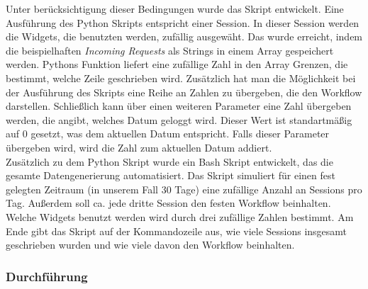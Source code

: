Unter berücksichtigung dieser Bedingungen wurde das Skript entwickelt. Eine Ausführung des Python Skripts entspricht einer Session. In dieser Session werden die Widgets, die \glqq benutzten\grqq{} werden, zufällig ausgewäht. Das wurde erreicht, indem die beispielhaften \textit{Incoming Requests} als Strings in einem Array gespeichert werden. Pythons  Funktion liefert eine zufällige Zahl in den Array Grenzen, die bestimmt, welche Zeile geschrieben wird. Zusätzlich hat man die Möglichkeit bei der Ausführung des Skripts eine Reihe an Zahlen zu übergeben, die den Workflow darstellen. Schließlich kann über einen weiteren Parameter eine Zahl übergeben werden, die angibt, welches Datum geloggt wird. Dieser Wert ist standartmäßig auf 0 gesetzt, was dem aktuellen Datum entspricht. Falls dieser Parameter übergeben wird, wird die Zahl zum aktuellen Datum addiert.\\
Zusätzlich zu dem Python Skript wurde ein Bash Skript entwickelt, das die gesamte Datengenerierung automatisiert. Das Skript simuliert für einen fest gelegten Zeitraum (in unserem Fall 30 Tage) eine zufällige Anzahl an Sessions pro Tag. Außerdem soll ca. jede dritte Session den festen Workflow beinhalten. Welche Widgets benutzt werden wird durch drei zufällige Zahlen bestimmt. Am Ende gibt das Skript auf der Kommandozeile aus, wie viele Sessions insgesamt geschrieben wurden und wie viele davon den Workflow beinhalten.

\subsubsection{Durchführung}
\label{ssub:Durchführung}

